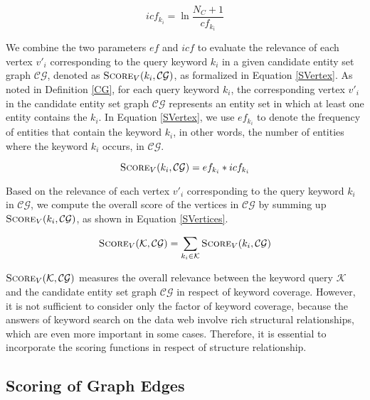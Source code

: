 \begin{equation}\label{icf}
icf_{k_i} = \ln\frac{N_C+1}{cf_{k_i}}
\end{equation}

We combine the two parameters $ef$ and $icf$ to evaluate the relevance of each vertex $v'_i$
corresponding to the query keyword $k_i$ in a given candidate entity set graph $\mathcal{CG}$,
denoted as $\textsc{Score}_{V}(k_i,\mathcal{CG})$, as formalized in Equation \ref{SVertex}. As noted
in Definition \ref{CG}, for each query keyword $k_i$, the corresponding vertex $v'_i$ in the
candidate entity set graph $\mathcal{CG}$ represents an entity set in which at least one entity
contains the $k_i$. In Equation \ref{SVertex}, we use $ef_{k_i}$ to denote the frequency of entities
that contain the keyword $k_i$, in other words, the number of entities where the keyword $k_i$
occurs, in $\mathcal{CG}$.

\begin{equation}\label{SVertex}
\textsc{Score}_{V}(k_i,\mathcal{CG}) =
ef_{k_i} * icf_{k_i} 
\end{equation}

Based on the relevance of each vertex $v'_i$ corresponding to the query keyword $k_i$ in
$\mathcal{CG}$, we compute the overall score of the vertices in $\mathcal{CG}$ by summing up
$\textsc{Score}_{V}(k_i,\mathcal{CG})$, as shown in Equation \ref{SVertices}.

\begin{equation}\label{SVertices}
\textsc{Score}_{V}(\mathcal{K},\mathcal{CG}) =
\sum_{k_i \in \mathcal{K}} \textsc{Score}_{V}(k_i,\mathcal{CG})
\end{equation}

$\textsc{Score}_{V}(\mathcal{K},\mathcal{CG})$ measures the overall relevance between the keyword
query $\mathcal{K}$ and the candidate entity set graph $\mathcal{CG}$ in respect of keyword coverage.
However, it is not sufficient to consider only the factor of keyword coverage, because the answers
of keyword search on the data web involve rich structural relationships, which are even more important
in some cases. Therefore, it is essential to incorporate the scoring functions in respect of
structure relationship.
 
\subsection{Scoring of Graph Edges}

